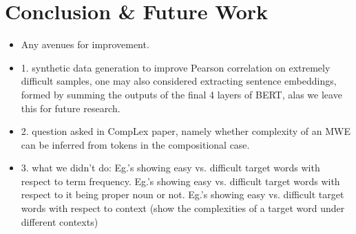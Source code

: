 \documentclass[11pt,a4paper]{article}
\begin{document}
\section{Conclusion \& Future Work}

\begin{itemize}
  \item Any avenues for improvement.
  \item 1. synthetic data generation to improve Pearson correlation on extremely difficult samples, one may also considered extracting sentence embeddings, formed by summing the outputs of the final 4 layers of BERT, alas we leave this for future research.
  \item 2. question asked in CompLex paper, namely whether complexity of an MWE can be inferred from tokens in the compositional case.
  \item 3. what we didn't do: Eg.'s showing easy vs. difficult target words with respect to term frequency. Eg.'s showing easy vs. difficult target words with respect to it being proper noun or not. Eg.'s showing easy vs. difficult target words with respect to context (show the complexities of a target word under different contexts)
\end{itemize}




\end{document}
